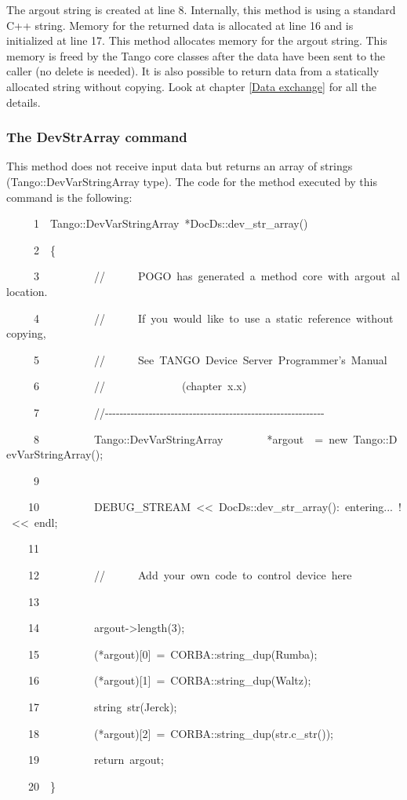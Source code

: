 The argout string is created at line 8. Internally, this method is
using a standard C++ string. Memory for the returned data is allocated
at line 16 and is initialized at line 17. This method allocates memory
for the argout string. This memory is freed by the Tango core classes
after the data have been sent to the caller (no delete is needed).
It is also possible to return data from a statically allocated string
without copying. Look at chapter \ref{Data exchange} for all the
details.

\subsubsection{The DevStrArray command}

This method does not receive input data but returns an array of strings
(Tango::DevVarStringArray type).
The code for the method executed by this command is the following:


\begin{lyxcode}
~~~~~1~~Tango::DevVarStringArray~{*}DocDs::dev\_str\_array()

~~~~~2~~\{

~~~~~3~~~~~~~~~~//~~~~~~POGO~has~generated~a~method~core~with~argout~allocation.

~~~~~4~~~~~~~~~~//~~~~~~If~you~would~like~to~use~a~static~reference~without~copying,

~~~~~5~~~~~~~~~~//~~~~~~See~\textquotedbl{}TANGO~Device~Server~Programmer's~Manual\textquotedbl{}

~~~~~6~~~~~~~~~~//~~~~~~~~~~~~~~(chapter~x.x)

~~~~~7~~~~~~~~~~//-{}-{}-{}-{}-{}-{}-{}-{}-{}-{}-{}-{}-{}-{}-{}-{}-{}-{}-{}-{}-{}-{}-{}-{}-{}-{}-{}-{}-{}-{}-{}-{}-{}-{}-{}-{}-{}-{}-{}-{}-{}-{}-{}-{}-{}-{}-{}-{}-{}-{}-{}-{}-{}-{}-{}-{}-{}-{}-{}-

~~~~~8~~~~~~~~~~Tango::DevVarStringArray~~~~~~~~{*}argout~~=~new~Tango::DevVarStringArray();

~~~~~9~~

~~~~10~~~~~~~~~~DEBUG\_STREAM~<\textcompwordmark{}<~\textquotedbl{}DocDs::dev\_str\_array():~entering...~!\textquotedbl{}~<\textcompwordmark{}<~endl;

~~~~11~~

~~~~12~~~~~~~~~~//~~~~~~Add~your~own~code~to~control~device~here

~~~~13~~

~~~~14~~~~~~~~~~argout->length(3);

~~~~15~~~~~~~~~~({*}argout){[}0{]}~=~CORBA::string\_dup(\textquotedbl{}Rumba\textquotedbl{});

~~~~16~~~~~~~~~~({*}argout){[}1{]}~=~CORBA::string\_dup(\textquotedbl{}Waltz\textquotedbl{});

~~~~17~~~~~~~~~~string~str(\textquotedbl{}Jerck\textquotedbl{});

~~~~18~~~~~~~~~~({*}argout){[}2{]}~=~CORBA::string\_dup(str.c\_str());

~~~~19~~~~~~~~~~return~argout;

~~~~20~~\}
\end{lyxcode}


